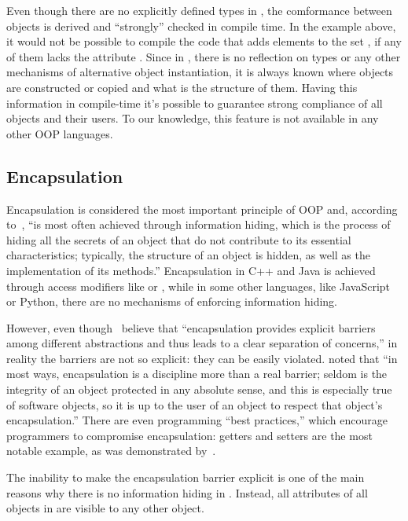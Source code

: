 Even though there are no explicitly defined types in \phic{},
the comformance between objects is derived and ``strongly'' checked
in compile time. In the example above, it would not be possible to
compile the code that adds elements to the set , if any
of them lacks the attribute . Since in \eo{},
there is no reflection on types or any other mechanisms
of alternative object instantiation, it is always known where
objects are constructed or copied and what is the structure of them.
Having this information in compile-time it's possible to guarantee
strong compliance of all objects and their users. To our knowledge,
this feature is not available in any other OOP languages.

\subsection{Encapsulation}

Encapsulation is considered the most important principle of OOP
and, according to~\citet[p.51]{grady2007object},
``is most often achieved through information hiding,
which is the process of hiding all the secrets of an object
that do not contribute to its essential characteristics;
typically, the structure of an object is hidden, as well
as the implementation of its methods.'' Encapsulation in C++ and
Java is achieved through access modifiers like  or
, while in some other languages, like JavaScript or Python,
there are no mechanisms of enforcing information hiding.

However, even though~\citet[p.51]{grady2007object} believe that
``encapsulation provides explicit barriers among different
abstractions and thus leads to a clear separation of concerns,''
in reality the barriers are not so explicit: they can be easily
violated.
\citet[p.141]{west2004object} noted that
``in most ways, encapsulation is a discipline more than a real barrier;
seldom is the integrity of an object protected in any absolute
sense, and this is especially true of software objects,
so it is up to the user of an object to respect that object's encapsulation.''
There are even programming ``best practices,'' which encourage
programmers to compromise encapsulation: getters and setters are
the most notable example, as was demonstrated by~\citet{holub2004more}.

The inability to make the encapsulation barrier explicit
is one of the main reasons why there is no information hiding in \phic{}.
Instead, all attributes of all objects in \phic{}
are visible to any other object.

